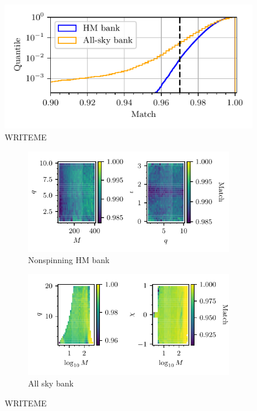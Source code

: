\documentclass[twocolumn,showpacs,preprintnumbers,nofootinbib,prd,
superscriptaddress,10pt]{revtex4-2}
\begin{document}
\begin{figure}[t]
	\centering
	\includegraphics[scale = 1.]{test_banks_hist}
	\caption{WRITEME}
	\label{fig:test_banks_hist}
\end{figure}
\begin{figure}[t]
	\centering
	\begin{subfigure}[t]{0.49\textwidth}
		\includegraphics[scale = 1.]{symphony_HM_injections}
		\caption{Nonspinning HM bank \cite{Harry:2017weg}}
		\label{fig:symphony_HM_injections}
	\end{subfigure}
	\hfill
	\begin{subfigure}[t]{0.49\textwidth}
		\includegraphics[scale = 1.]{bank_O4_injections}
		\caption{All sky bank \cite{Sakon:2022ibh}}
		\label{fig:bank_O4_injections}
	\end{subfigure}
	\caption{WRITEME}
\end{figure}
\end{document}
